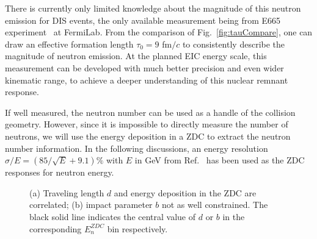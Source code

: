 There is currently only limited knowledge about the magnitude of this neutron emission
for DIS events, the only available measurement being
from E665 experiment~\cite{Adams:1995nu} at FermiLab. From the comparison of
Fig.~\ref{fig:tauCompare}, one can draw an effective formation length $\tau_{0}=9$ fm$/c$
to consistently describe the magnitude of neutron emission. At the planned EIC
energy scale, this measurement can be developed with much better precision and
even wider kinematic range, to achieve a deeper understanding of this
nuclear remnant response.


If well measured, the neutron number can be used as a handle of the collision
geometry. However, since it is impossible to directly measure the number of
neutrons, we will use the energy deposition in a ZDC to extract the neutron
number information. In the following discussions, an energy resolution $\sigma/E
= (85/\sqrt{E} + 9.1)\%$ with $E$ in GeV from Ref.~\cite{Adler:2000bd} has been used as the ZDC
responses for neutron energy. 

\begin{figure}[hbt!]
\begin{center} 
\quad
{}
\caption[Geometric quantity correlation with neutron energy deposit]
{(a) Traveling length $d$ and energy deposition in the ZDC are correlated; (b) impact parameter $b$ not as well constrained. The black solid line indicates the central value of $d$ or $b$ in the corresponding $E_{n}^{ZDC}$ bin respectively. } \label{fig:geoCorrelation}
\end{center} 
\end{figure}



